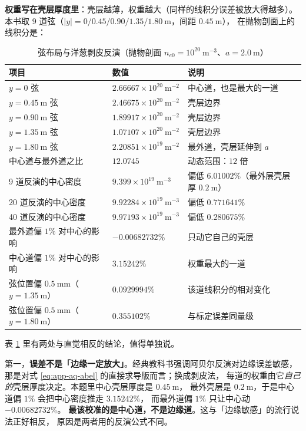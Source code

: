 \textbf{权重写在壳层厚度里}：壳层越薄，权重越大（同样的线积分误差被放大得越多）。
本书取 9 道弦（$|y| = 0/0.45/0.90/1.35/1.80\ \mathrm{m}$，间距 $0.45\ \mathrm{m}$），
在抛物剖面上的线积分是：

\begin{table}[htbp]
\centering
\small
\caption{弦布局与洋葱剥皮反演（抛物剖面 $n_{e0} = 10^{20}\ \mathrm{m^{-3}}$、$a = 2.0\ \mathrm{m}$）}
\label{tab:app-aq-abel}
\setlength{\tabcolsep}{4pt}
\begin{tabular}{p{4.0cm}p{4.0cm}p{5.6cm}}
\toprule
项目 & 数值 & 说明 \\
\midrule
$y = 0$ 弦 & $2.66667\times10^{20}\ \mathrm{m^{-2}}$ & 中心道，也是最大的一道 \\
$y = 0.45\ \mathrm{m}$ 弦 & $2.46675\times10^{20}\ \mathrm{m^{-2}}$ & 壳层边界 \\
$y = 0.90\ \mathrm{m}$ 弦 & $1.89917\times10^{20}\ \mathrm{m^{-2}}$ & 壳层边界 \\
$y = 1.35\ \mathrm{m}$ 弦 & $1.07107\times10^{20}\ \mathrm{m^{-2}}$ & 壳层边界 \\
$y = 1.80\ \mathrm{m}$ 弦 & $2.20851\times10^{19}\ \mathrm{m^{-2}}$ & 最外道，壳层延伸到 $a$ \\
中心道与最外道之比 & $12.0745$ & 动态范围：$12$ 倍 \\
\midrule
9 道反演的中心密度 & $9.399\times10^{19}\ \mathrm{m^{-3}}$ & 偏低 $6.01002\%$（最外层壳层厚 $0.2\ \mathrm{m}$） \\
20 道反演的中心密度 & $9.92284\times10^{19}\ \mathrm{m^{-3}}$ & 偏低 $0.771641\%$ \\
40 道反演的中心密度 & $9.97193\times10^{19}\ \mathrm{m^{-3}}$ & 偏低 $0.280675\%$ \\
\midrule
最外道偏 $1\%$ 对中心的影响 & $-0.00682732\%$ & 只动它自己的壳层 \\
中心道偏 $1\%$ 对中心的影响 & $3.15242\%$ & 权重最大的一道 \\
弦位置偏 $0.5\ \mathrm{mm}$（$y = 1.35\ \mathrm{m}$） & $0.0929994\%$ & 该道线积分的相对变化 \\
弦位置偏 $0.5\ \mathrm{mm}$（$y = 1.80\ \mathrm{m}$） & $0.355102\%$ & 与标定误差同量级 \\
\bottomrule
\end{tabular}
\end{table}

表 \ref{tab:app-aq-abel} 里有两处与直觉相反的结论，值得单独说。

第一，\textbf{误差不是「边缘一定放大」}。经典教科书强调阿贝尔反演对边缘误差敏感，
那是对式 \eqref{eq:app-aq-abel} 的直接求导版而言；换成剥皮法，
每道的权重由它\emph{自己的}壳层厚度决定。本题里中心壳层厚度是 $0.45\ \mathrm{m}$，
最外壳层是 $0.2\ \mathrm{m}$，于是中心道偏 $1\%$ 会把中心密度推走 $3.15242\%$，
而最外道偏 $1\%$ 只让中心动 $-0.00682732\%$。
\textbf{最该校准的是中心道，不是边缘道}。这与「边缘敏感」的流行说法正好相反，
原因是两者用的反演公式不同。

